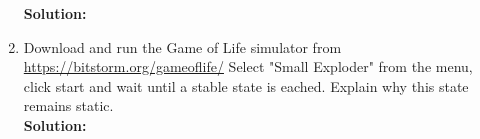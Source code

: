 \documentclass[a4paper]{article}
\begin{document}
\begin{enumerate}
	
	
	\textbf{Solution:}\\
	
	
	
	
	
	\item Download and run the Game of Life simulator from \url{https://bitstorm.org/gameoflife/} Select "Small Exploder" from the menu, click start and wait until a stable state is eached. Explain why this state remains static.\\
	\textbf{Solution:}\\
	

\end{enumerate}
\end{document}
